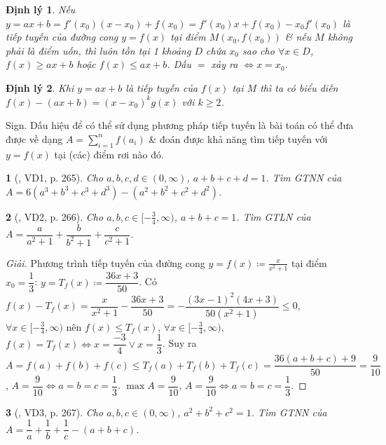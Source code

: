 \documentclass{article}
\newtheorem{baitoan}{}
\newtheorem{dinhly}{Định lý}
\begin{document}
\begin{dinhly}
	Nếu $y = ax + b = f'(x_0)(x - x_0) + f(x_0) = f'(x_0)x + f(x_0) - x_0f'(x_0)$ là tiếp tuyến của đường cong $y = f(x)$ tại điểm $M(x_0,f(x_0))$ \& nếu $M$ không phải là điểm uốn, thì luôn tồn tại 1 khoảng $D$ chứa $x_0$ sao cho $\forall x\in D$, $f(x)\ge ax + b$ hoặc $f(x)\le ax + b$. Dấu $=$ xảy ra $\Leftrightarrow x = x_0$.
\end{dinhly}

\begin{dinhly}
	Khi $y = ax + b$ là tiếp tuyến của $f(x)$ tại $M$ thì ta có biểu diễn $f(x) - (ax + b) = (x - x_0)^kg(x)$ với $k\ge2$.
\end{dinhly}
{\sf Sign.} Dấu hiệu để có thể sử dụng phương pháp tiếp tuyến là bài toán có thể đưa được về dạng $A = \sum_{i=1}^n f(a_i)$ \& đoán được khả năng tìm tiếp tuyến với $y = f(x)$ tại (các) điểm rơi nào đó.

\begin{baitoan}[\cite{Khai_Huong_bdt}, VD1, p. 265]
	Cho $a,b,c,d\in(0,\infty)$, $a + b + c + d = 1$. Tìm {\rm GTNN} của $A = 6(a^3 + b^3 + c^3 + d^3) - (a^2 + b^2 + c^2 + d^2)$.
\end{baitoan}

\begin{baitoan}[\cite{Khai_Huong_bdt}, VD2, p. 266]
	Cho $a,b,c\in[-\frac{3}{4},\infty)$, $a + b + c = 1$. Tìm {\rm GTLN} của $A = \dfrac{a}{a^2 + 1} + \dfrac{b}{b^2 + 1} + \dfrac{c}{c^2 + 1}$.
\end{baitoan}

\begin{proof}[Giải]
	Phương trình tiếp tuyến của đường cong $y = f(x)\coloneqq\frac{x}{x^2 + 1}$ tại điểm $x_0 = \dfrac{1}{3}$: $y = T_f(x)\coloneqq\dfrac{36x + 3}{50}$. Có $f(x) - T_f(x) = \dfrac{x}{x^2 + 1} - \dfrac{36x + 3}{50} = -\dfrac{(3x - 1)^2(4x + 3)}{50(x^2 + 1)}\le0$, $\forall x\in[-\frac{3}{4},\infty)$ nên $f(x)\le T_f(x)$, $\forall x\in[-\frac{3}{4},\infty)$, $f(x) = T_f(x)\Leftrightarrow x = \dfrac{-3}{4}\lor x = \dfrac{1}{3}$. Suy ra $A = f(a) + f(b) + f(c)\le T_f(a) + T_f(b) + T_f(c) = \dfrac{36(a + b + c) + 9}{50} = \dfrac{9}{10}$, $A = \dfrac{9}{10}\Leftrightarrow a = b = c = \dfrac{1}{3}$. $\max A = \dfrac{9}{10}$, $A = \dfrac{9}{10}\Leftrightarrow a = b = c = \dfrac{1}{3}$.
\end{proof}

\begin{baitoan}[\cite{Khai_Huong_bdt}, VD3, p. 267]
	Cho $a,b,c\in(0,\infty)$, $a^2 + b^2 + c^2 = 1$. Tìm {\rm GTNN} của $A = \dfrac{1}{a} + \dfrac{1}{b} + \dfrac{1}{c} - (a + b + c)$.
\end{baitoan}
\end{document}
